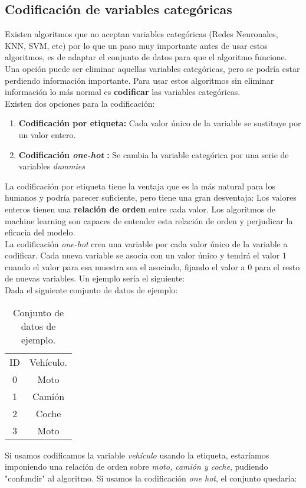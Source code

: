 \subsection{Codificación de variables categóricas}
Existen algoritmos que no aceptan variables categóricas (Redes Neuronales, KNN, SVM, etc) por lo que un paso muy importante antes de usar estos algoritmos, es de adaptar el conjunto de datos para que el algoritmo funcione. \\
Una opción puede ser eliminar aquellas variables categóricas, pero se podría estar perdiendo información importante. Para usar estos algoritmos sin eliminar información lo más normal es \textbf{codificar} las variables categóricas.\\
Existen dos opciones para la codificación:
\begin{enumerate}
	\item \textbf{Codificación por etiqueta:} Cada valor único de la variable se sustituye por un valor entero.
	      \item\textbf{Codificación \textit{one-hot }:} Se cambia la variable categórica por una serie de variables \textit{dummies}
\end{enumerate}

La codificación por etiqueta tiene la ventaja que es la más natural para los humanos y podría parecer suficiente, pero tiene una gran desventaja: Los valores enteros tienen una \textbf{relación de orden} entre cada valor. Los algoritmos de machine learning son capaces de entender esta relación de orden y perjudicar la eficacia del modelo.\\
\linebreak
La codificación \textit{one-hot} crea una variable por cada valor único de la variable a codificar. Cada nueva variable se asocia con un valor único y tendrá el valor $1$ cuando el valor para esa muestra sea el asociado, fijando el valor a $0$ para el resto de nuevas variables. Un ejemplo sería el siguiente:\\
Dada el siguiente conjunto de datos de ejemplo:\\
\begin{table}[H]
	\centering
	\begin{tabular}{|c|c|}
		\cline{1-2}
		ID & Vehículo. \\ \cline{1-2}
		0  & Moto      \\ \cline{1-2}
		1  & Camión    \\ \cline{1-2}
		2  & Coche     \\ \cline{1-2}
		3  & Moto      \\ \cline{1-2}
	\end{tabular}
	\caption{Conjunto de datos de ejemplo.}
	\label{tab:conjunto_ejemplo}
\end{table}
Si usamos codificamos la variable \textit{vehículo} usando la etiqueta, estaríamos imponiendo una relación de orden sobre \textit{moto, camión y coche}, pudiendo "confundir" al algoritmo. Si usamos la codificación \textit{one hot}, el conjunto quedaría:


